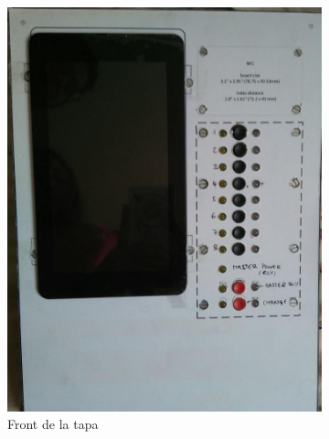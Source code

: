\begin{figure}[H]
	\centering
	\begin{subfigure}[b]{0.45\textwidth}
		\includegraphics[width=\textwidth]{images/demonstrator_front}
		\caption{Front de la tapa}
		\label{fig:admin1}
	\end{subfigure}
	\hspace{0.5cm}
	\begin{subfigure}[b]{0.50\textwidth}

\end{subfigure}
\end{figure}
